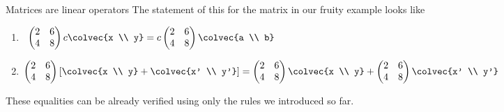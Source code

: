 \noindent
\hypertarget{Matrices are linear operators}{Matrices are linear operators} 
The statement of this for the matrix in our fruity example looks like
\begin{enumerate}
\item~$\begin{pmatrix}
      2             &6 \\
      4            &8
    \end{pmatrix}
   c \colvec{x \\ y} 
   =c  \begin{pmatrix}
      2             &6 \\
      4            &8
    \end{pmatrix}
   \colvec{a \\ b} ~$
\item
$     \begin{pmatrix}
      2             &6 \\
      4            &8
    \end{pmatrix}
   \left[ \colvec{x \\ y} +\colvec{x' \\ y'} \right] 
   = \begin{pmatrix}
      2             &6 \\
      4            &8
    \end{pmatrix}
\colvec{x \\ y}
   +
    \begin{pmatrix}
      2             &6 \\
      4            &8
    \end{pmatrix}
    \colvec{x' \\ y'}
$
\end{enumerate}
These equalities can be already verified using only the rules we introduced so far.
